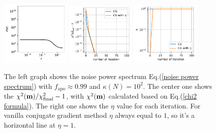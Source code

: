 \documentclass[twocolumn,linenumbers]{aastex631}
\newcommand{\vbm}{\vb{m}}
\begin{document}
\begin{figure}[htb!]
\centering
\includegraphics[width=0.3\textwidth]{0.1/small_condition_num/P_f.pdf}
\includegraphics[width=0.3\textwidth]{0.1/small_condition_num/chi2_CG.pdf}
\includegraphics[width=0.3\textwidth]{0.1/small_condition_num/eta_CG.pdf}
\caption{The left graph shows the noise power spectrum
    Eq.(\ref{noise power spectrum}) with $f_{\text{apo}} \approx 0.99$ and
    $\kappa(N) = 10^2$. The center one shows the
    $\chi^2(\vbm)/\chi^2_{\text{final}} - 1$, with $\chi^2(\vbm)$ calculated
    based on Eq.(\ref{chi2 formula}).
    The right one shows the $\eta$ value for each iteration. For vanilla 
    conjugate gradient method $\eta$ always equal to $1$, so it's a horizontal
    line at $\eta=1$.
}
\label{small condi num CG}
\end{figure}
\end{document}

